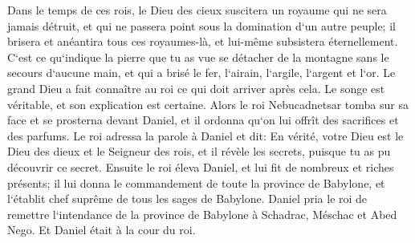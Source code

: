 \verse Dans le temps de ces rois, le Dieu des cieux suscitera un royaume qui ne sera jamais détruit, et qui ne passera point sous la domination d`un autre peuple; il brisera et anéantira tous ces royaumes-là, et lui-même subsistera éternellement. 
\verse C`est ce qu`indique la pierre que tu as vue se détacher de la montagne sans le secours d`aucune main, et qui a brisé le fer, l`airain, l`argile, l`argent et l`or. Le grand Dieu a fait connaître au roi ce qui doit arriver après cela. Le songe est véritable, et son explication est certaine. 
\verse Alors le roi Nebucadnetsar tomba sur sa face et se prosterna devant Daniel, et il ordonna qu`on lui offrît des sacrifices et des parfums. 
\verse Le roi adressa la parole à Daniel et dit: En vérité, votre Dieu est le Dieu des dieux et le Seigneur des rois, et il révèle les secrets, puisque tu as pu découvrir ce secret. 
\verse Ensuite le roi éleva Daniel, et lui fit de nombreux et riches présents; il lui donna le commandement de toute la province de Babylone, et l`établit chef suprême de tous les sages de Babylone. 
\verse Daniel pria le roi de remettre l`intendance de la province de Babylone à Schadrac, Méschac et Abed Nego. Et Daniel était à la cour du roi. 

